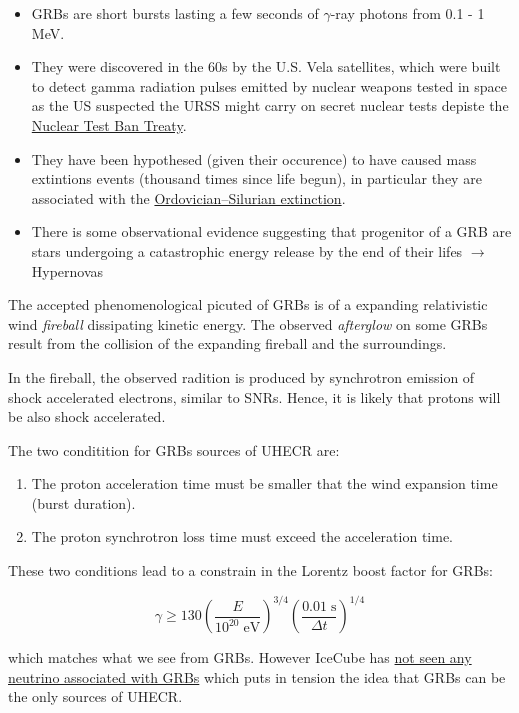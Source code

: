 \documentclass[
  letterpaper,
  DIV=11,
  numbers=noendperiod]{scrreprt}
\begin{document}
\begin{itemize}
\item
  GRBs are short bursts lasting a few seconds of \(\gamma\)-ray photons
  from 0.1 - 1 MeV.
\item
  They were discovered in the 60s by the U.S. Vela satellites, which
  were built to detect gamma radiation pulses emitted by nuclear weapons
  tested in space as the US suspected the URSS might carry on secret
  nuclear tests depiste the
  \href{http://en.wikipedia.org/wiki/Nuclear_Test_Ban_Treaty}{Nuclear
  Test Ban Treaty}.
\item
  They have been hypothesed (given their occurence) to have caused mass
  extintions events (thousand times since life begun), in particular
  they are associated with the
  \href{http://en.wikipedia.org/wiki/Ordovician\%E2\%80\%93Silurian_extinction_event}{Ordovician--Silurian
  extinction}.
\item
  There is some observational evidence suggesting that progenitor of a
  GRB are stars undergoing a catastrophic energy release by the end of
  their lifes \(\rightarrow\) Hypernovas
\end{itemize}

The accepted phenomenological picuted of GRBs is of a expanding
relativistic wind \emph{fireball} dissipating kinetic energy. The
observed \emph{afterglow} on some GRBs result from the collision of the
expanding fireball and the surroundings.

In the fireball, the observed radition is produced by synchrotron
emission of shock accelerated electrons, similar to SNRs. Hence, it is
likely that protons will be also shock accelerated.

The two conditition for GRBs sources of UHECR are:

\begin{enumerate}
\def\labelenumi{\arabic{enumi}.}
\item
  The proton acceleration time must be smaller that the wind expansion
  time (burst duration).
\item
  The proton synchrotron loss time must exceed the acceleration time.
\end{enumerate}

These two conditions lead to a constrain in the Lorentz boost factor for
GRBs:

\[\gamma \geq 130\left(\frac{E}{10^{20}\mathrm{\; eV}}\right)^{3/4}\left(\frac{0.01\mathrm{\; s}}{\Delta t}\right)^{1/4}\]

which matches what we see from GRBs. However IceCube has
\href{http://arxiv.org/abs/1204.4219}{not seen any neutrino associated
with GRBs} which puts in tension the idea that GRBs can be the only
sources of UHECR.
\end{document}
